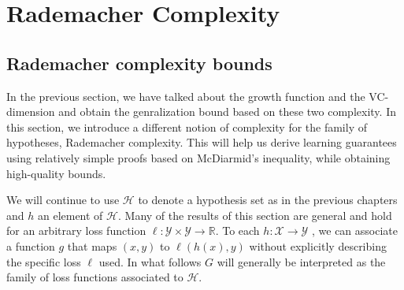 \section{Rademacher Complexity}
\subsection{Rademacher complexity bounds}
In the previous section, we have talked about the growth function and the VC-dimension and obtain the genralization bound based on these two complexity. In this section, we introduce a different notion of complexity for the family of hypotheses, Rademacher complexity. This will help us derive learning guarantees using relatively simple proofs based on McDiarmid's inequality, while obtaining high-quality bounds.

We will continue to use $\mathcal{H}$ to denote a hypothesis set as in the previous chapters
and $h$ an element of $\mathcal{H}$. Many of the results of this section are general and hold for
an arbitrary loss function $\ell :\mathcal{Y}\times \mathcal{Y} \to \mathbb{R}$. To each $h: \mathcal{X}\to \mathcal{Y}$ , we can associate a function $g$ that maps $(x,y)$ to $\ell(h(x),y)$ without explicitly describing the specific loss $\ell$ used. In what follows $G$ will generally be interpreted as the family of loss functions associated to $\mathcal{H}$.

